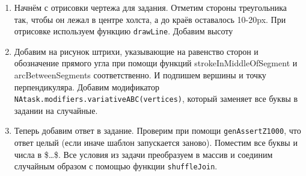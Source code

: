 \begin{enumerate}
    \item Начнём с отрисовки чертежа для задания. Отметим стороны треугольника так, чтобы он лежал в центре холста, а до краёв оставалось 10-20px. При отрисовке используем функцию \texttt{drawLine}. Добавим высоту 
     
    \item Добавим на рисунок штрихи, указывающие на равенство сторон и обозначение прямого угла при помощи функций strokeInMiddleOfSegment и arcBetweenSegments соответственно. И подпишем вершины и точку перпендикуляра. Добавим модификатор \texttt{NAtask.modifiers.variativeABC(vertices)}, который заменяет все буквы в задании на случайные.
     
    \item Теперь добавим ответ в задание. Проверим при помощи \texttt{genAssertZ1000}, что ответ целый (если иначе шаблон запускается заново). Поместим все буквы и числа в \$\dots\$. Все условия из задачи преобразуем в массив и соединим случайным образом с помощью функции \texttt{shuffleJoin}.
     
\end{enumerate}

